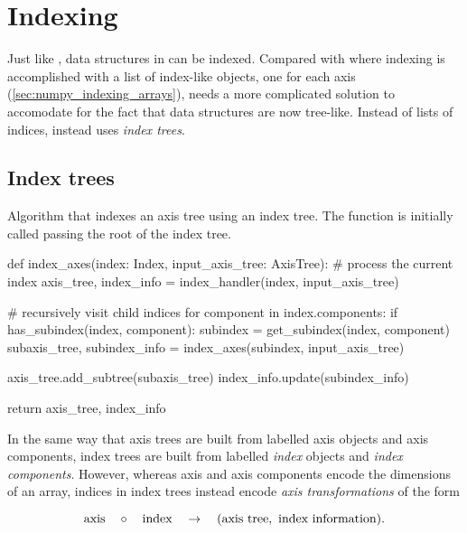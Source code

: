 \documentclass[thesis]{subfiles}
\begin{document}
\chapter{Indexing}
\label{chapter:indexing}

Just like \numpy, data structures in  can be indexed.
Compared with \numpy where indexing is accomplished with a list of index-like objects, one for each axis (\cref{sec:numpy_indexing_arrays}),  needs a more complicated solution to accomodate for the fact that data structures are now tree-like.
Instead of lists of indices,  instead uses \emph{index trees}.

\section{Index trees}
\label{sec:index_trees}

\begin{algorithm}
  \caption{
    Algorithm that indexes an axis tree using an index tree.
    The function is initially called passing the root of the index tree.
  }

  \begin{pyalg2}
    def index_axes(index: Index, input_axis_tree: AxisTree):
      # process the current index
      axis_tree, index_info = index_handler(index, input_axis_tree)

      # recursively visit child indices
      for component in index.components:
        if has_subindex(index, component):
          subindex = get_subindex(index, component)
          subaxis_tree, subindex_info = index_axes(subindex, input_axis_tree)

          axis_tree.add_subtree(subaxis_tree)
          index_info.update(subindex_info)

      return axis_tree, index_info
  \end{pyalg2}

  \label{alg:index_axis_tree}
\end{algorithm}

In the same way that axis trees are built from labelled axis objects and axis components, index trees are built from labelled \emph{index} objects and \emph{index components}.
However, whereas axis and axis components encode the dimensions of an array, indices in index trees instead encode \emph{axis transformations} of the form

\begin{equation}
  \textnormal{axis} \quad \circ \quad \textnormal{index} \quad \to \quad (\textnormal{axis tree},\ \textnormal{index information}).
  \label{eq:index_transform}
\end{equation}
\end{document}

